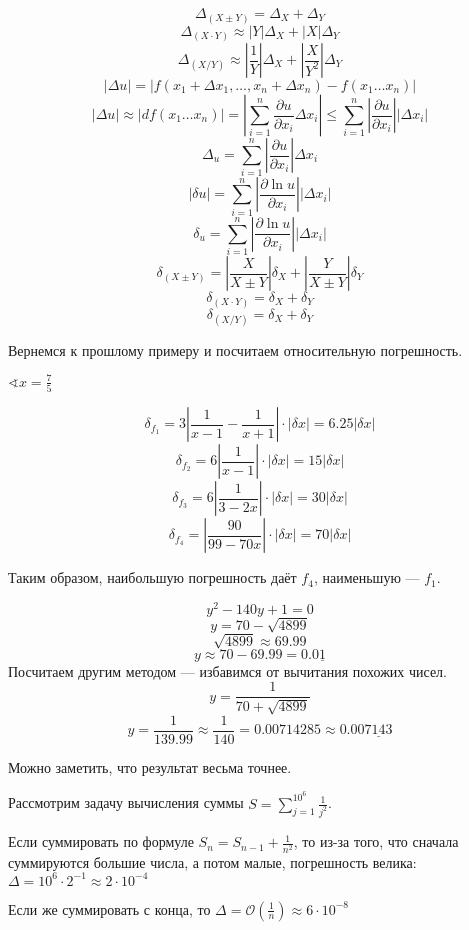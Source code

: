 \[\Delta_{(X \pm Y)} = \Delta_X + \Delta_Y\]
\[\Delta_{(X\cdot Y)} \approx |Y|\Delta_X + |X|\Delta_Y\]
\[\Delta_{(X / Y)} \approx \left|\frac{1}{Y}\right| \Delta_X + \left|\frac{X}{Y^2}\right| \Delta_Y\]
\[|\Delta u| = |f(x_1 + \Delta x_1, \dots , x_n + \Delta x_n) - f(x_1 \dots x_n)|\]
\[|\Delta u| \approx |df(x_1 \dots x_n)| = \left|\sum_{i = 1}^n \frac{\partial u}{\partial x_i} \Delta x_i\right| \leq \sum_{i = 1}^n \left|\frac{\partial u}{\partial x_i}\right| |\Delta x_i|\]
\[\Delta_u = \sum_{i = 1}^n \left|\frac{\partial u}{\partial x_i}\right| \Delta x_i\]
\[|\delta u| = \sum_{i = 1}^n \left|\frac{\partial \ln u}{\partial x_i}\right||\Delta x_i|\]
\[\delta_u = \sum_{i = 1}^n \left|\frac{\partial \ln u}{\partial x_i}\right||\Delta x_i|\]
\[\delta_{(X \pm Y)} = \left|\frac{X}{X \pm Y}\right|\delta_X + \left|\frac{Y}{X \pm Y}\right|\delta_Y\]
\[\delta_{(X\cdot Y)} = \delta_X + \delta_Y\]
\[\delta_{(X / Y)} = \delta_X + \delta_Y\]

Вернемся к прошлому примеру и посчитаем относительную погрешность.

\(\sphericalangle x = \frac{7}{5}\)

\[\delta_{f_1} = 3 \left|\frac{1}{x - 1} - \frac{1}{x + 1}\right| \cdot |\delta x| = 6.25 |\delta x|\]
\[\delta_{f_2} = 6 \left|\frac{1}{x - 1}\right| \cdot |\delta x| = 15 |\delta x|\]
\[\delta_{f_3} = 6 \left|\frac{1}{3 - 2x}\right| \cdot |\delta x| = 30 |\delta x|\]
\[\delta_{f_4} = \left|\frac{90}{99 - 70x}\right| \cdot |\delta x| = 70 |\delta x|\]

Таким образом, наибольшую погрешность даёт \(f_4\), наименьшую --- \(f_1\).

\begin{example}
    \[y^2 - 140y + 1 = 0\]
    \[y = 70 - \sqrt{4899}\]
    \[\sqrt{4899}\approx 69.99\]
    \[y\approx 70 - 69.99 = 0.0\underline 1\]
    Посчитаем другим методом --- избавимся от вычитания похожих чисел.
    \[y = \frac{1}{70 + \sqrt{4899}}\]
    \[y = \frac{1}{139.99}\approx \frac{1}{140} = 0.00714285 \approx 0.00\underline{7143}\]

    Можно заметить, что результат весьма точнее.
\end{example}

\begin{example}
    Рассмотрим задачу вычисления суммы \(S = \sum_{j = 1}^{10^6} \frac{1}{j^2}\).

    Если суммировать по формуле \(S_n = S_{n - 1} + \frac{1}{n^2}\), то из-за того, что сначала суммируются большие числа, а потом малые, погрешность велика: \(\Delta = 10^6 \cdot 2^{ - 1}\approx 2\cdot 10^{ - 4}\)

    Если же суммировать с конца, то \(\Delta = \mathcal{O}\left( \frac{1}{n} \right) \approx 6\cdot 10^{ - 8}\)
\end{example}

